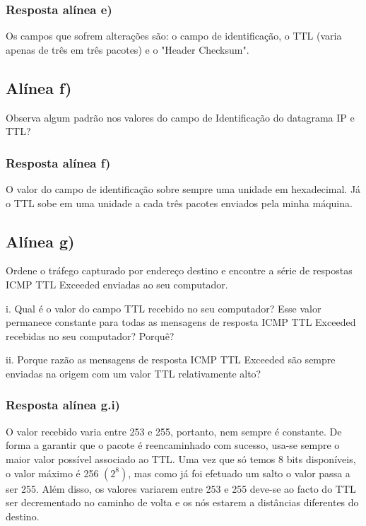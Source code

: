 \documentclass{article}
\begin{document}
\subsubsection{Resposta alínea e)}

Os campos que sofrem alterações são: o campo de identificação, o TTL (varia apenas de três em três pacotes) e o "Header Checksum".


\subsection{Alínea f)}

Observa algum padrão nos valores do campo de Identificação do datagrama IP e TTL?

\subsubsection{Resposta alínea f)}

O valor do campo de identificação sobre sempre uma unidade em hexadecimal. Já o TTL sobe em uma unidade a cada três pacotes enviados pela minha máquina. 

\subsection{Alínea g)}

Ordene o tráfego capturado por endereço destino e encontre a série de respostas ICMP TTL Exceeded enviadas
ao seu computador.

i. Qual é o valor do campo TTL recebido no seu computador? Esse valor permanece constante para todas
as mensagens de resposta ICMP TTL Exceeded recebidas no seu computador? Porquê?

ii. Porque razão as mensagens de resposta ICMP TTL Exceeded são sempre enviadas na origem com um
valor TTL relativamente alto?

\subsubsection{Resposta alínea g.i)}
O valor recebido varia entre 253 e 255, portanto, nem sempre é constante. De forma a garantir que o pacote é reencaminhado com sucesso, usa-se sempre o maior valor possível associado ao TTL. Uma vez que só temos 8 bits disponíveis, o valor máximo é 256  \((2^8)\), mas como já foi efetuado um salto o valor passa a ser 255. Além disso, os valores variarem entre 253 e 255 deve-se ao facto do TTL ser decrementado no caminho de volta e os nós estarem a distâncias diferentes do destino.
\end{document}

